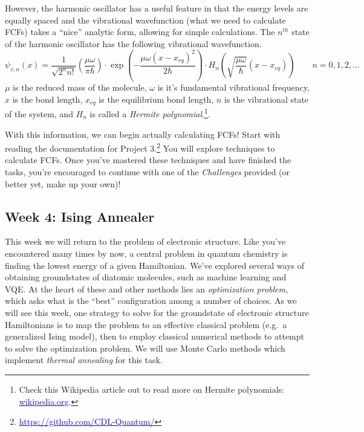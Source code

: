 \documentclass[12pt]{article}
\begin{document}
However, the harmonic oscillator has a useful feature in that the energy levels are equally spaced and the vibrational wavefunction (what we need to calculate FCFs) takes a ``nice'' analytic form, allowing for simple calculations. The $n^{th}$ state of the harmonic oscillator has the following vibrational wavefunction.
\begin{equation}
    \psi_{v,n}(x) = \frac{1}{\sqrt{2^nn!}}\left(\frac{\mu\omega}{\pi\hbar}\right)\cdot\exp\left(-\frac{\mu\omega (x-x_{eq})^2}{2\hbar}\right)\cdot H_n\left(\sqrt{\frac{\mu\omega}{\hbar}}(x-x_{eq})\right) \qquad n=0,1,2,...
\end{equation}
$\mu$ is the reduced mass of the molecule, $\omega$ is it's fundamental vibrational frequency, $x$ is the bond length, $x_{eq}$ is the equilibrium bond length, $n$ is the vibrational state of the system, and $H_n$ is called a {\it Hermite polynomial}.\footnote{Check this Wikipedia article out to read more on Hermite polynomials: \href{https://en.wikipedia.org/wiki/Hermite_polynomials}{\textcolor{blue}{wikipedia.org}}.}.

With this information, we can begin actually calculating FCFs! Start with reading the documentation for Project 3.\footnote{\href{https://github.com/CDL-Quantum/CohortProject_2020/tree/master/Project_3_Franck_Condon_Factors}
    {\textcolor{blue}{https://github.com/CDL-Quantum/}}}
You will explore techniques to calculate FCFs.
Once you've mastered these techniques and have finished the tasks, you're encouraged to continue with one of the {\it Challenges} provided (or better yet, make up your own)!

\subsection{Week 4: Ising Annealer}

This week we will return to the problem of electronic structure.  Like you've encountered many times by now, a central problem in quantum chemistry is finding the lowest
energy of a given Hamiltonian.  We've explored several ways of obtaining groundstates of diatomic molecules, such as machine learning
and VQE.  At the heart of these and other methods lies an {\it optimization problem}, which asks what is the ``best'' configuration among a number of choices.
As we will see this week, one strategy to solve for the groundstate of electronic structure Hamiltonians is to map the problem to an effective classical problem
(e.g.~a generalized Ising model),
then to employ classical numerical methods to attempt to solve the optimization problem.  We will use Monte Carlo methods which implement
{\it thermal annealing} for this task.
\end{document}
